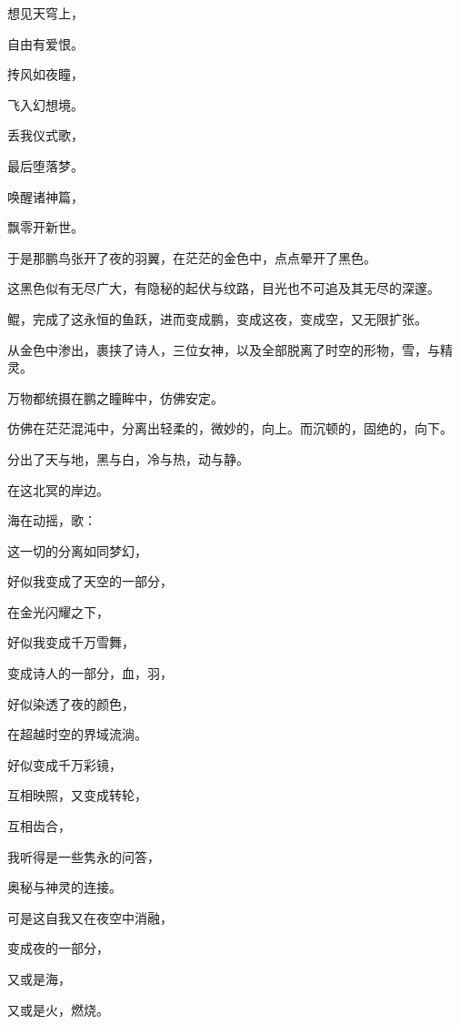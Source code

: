 \documentclass[UTF8]{article}
\begin{document}
\par 想见天穹上，
\par 自由有爱恨。
\par 抟风如夜瞳，
\par 飞入幻想境。
\par 丢我仪式歌，
\par 最后堕落梦。
\par 唤醒诸神篇，
\par 飘零开新世。
\\[0.6cm]
\par 于是那鹏鸟张开了夜的羽翼，在茫茫的金色中，点点晕开了黑色。
\par 这黑色似有无尽广大，有隐秘的起伏与纹路，目光也不可追及其无尽的深邃。
\par 鲲，完成了这永恒的鱼跃，进而变成鹏，变成这夜，变成空，又无限扩张。
\par 从金色中渗出，裹挟了诗人，三位女神，以及全部脱离了时空的形物，雪，与精灵。
\\[0.6cm]
\par 万物都统摄在鹏之瞳眸中，仿佛安定。
\par 仿佛在茫茫混沌中，分离出轻柔的，微妙的，向上。而沉顿的，固绝的，向下。
\par 分出了天与地，黑与白，冷与热，动与静。
\par 在这北冥的岸边。
\\[0.6cm]
\par 海在动摇，歌：
\\[0.6cm]
\par 这一切的分离如同梦幻，
\par 好似我变成了天空的一部分，
\par 在金光闪耀之下，
\par 好似我变成千万雪舞，
\par 变成诗人的一部分，血，羽，
\par 好似染透了夜的颜色，
\par 在超越时空的界域流淌。
\par 好似变成千万彩镜，
\par 互相映照，又变成转轮，
\par 互相齿合，
\par 我听得是一些隽永的问答，
\par 奥秘与神灵的连接。
\par 可是这自我又在夜空中消融，
\par 变成夜的一部分，
\par 又或是海，
\par 又或是火，燃烧。
\\[0.6cm]
\end{document}
